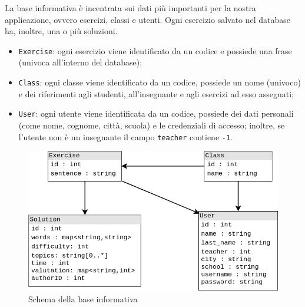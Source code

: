 La base informativa è incentrata sui dati più importanti per la nostra applicazione, ovvero esercizi, classi e utenti. Ogni esercizio salvato nel database ha, inoltre, una o più soluzioni.

\begin{itemize}
	\item \texttt{Exercise}: ogni esercizio viene identificato da un codice e possiede una frase (univoca all'interno del database);
	\item \texttt{Class}: ogni classe viene identificato da un codice, possiede un nome (univoco) e dei riferimenti agli studenti, all'insegnante e agli esercizi ad esso assegnati;
	\item \texttt{User}: ogni utente viene identificata da un codice, possiede dei dati personali (come nome, cognome, città, scuola) e le credenziali di accesso; inoltre, se l'utente non è un insegnante il campo \texttt{teacher} contiene \texttt{-1}.
\end{itemize}

\begin{figure}[ht]
	\centering
	\includegraphics[scale=0.65]{images/database.png}
	\caption{Schema della base informativa}
\end{figure}